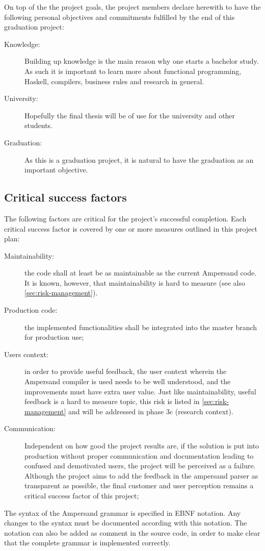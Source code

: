 On top of the the project goals, the project members declare herewith to have the following personal objectives and commitments fulfilled by the end of this graduation project:
\begin{description}
	\item[Knowledge:] Building up knowledge is the main reason why one starts a bachelor study.
		As such it is important to learn more about functional programming, Haskell, compilers, business rules and research in general.
	\item[University:] Hopefully the final thesis will be of use for the university and other students.
	\item[Graduation:] As this is a graduation project, it is natural to have the graduation as an important objective.
\end{description}

\subsection{Critical success factors}
\label{subsec:success-factors}
The following factors are critical for the project's successful completion.
Each critical success factor is covered by one or more measures outlined in this project plan:
\begin{description}
	\item[Maintainability:] the code shall at least be as maintainable as the current Ampersand code.
		It is known, however, that maintainability is hard to measure (see also \autoref{sec:risk-management}).
	\item[Production code:] the implemented functionalities shall be integrated into the master branch for production use;
	\item[Users context:] in order to provide useful feedback, the user context wherein the Ampersand compiler is used needs to be well understood, and the improvements must have extra user value. 
		Just like maintainability, useful feedback is a hard to measure topic, this risk is listed in \autoref{sec:risk-management} and will be addressed in phase 3c (research context).
	\item[Communication:] Independent on how good the project results are, if the solution is put into production without proper communication and documentation leading to confused and demotivated users, the project will be perceived as a failure. 
	Although the project aims to add the feedback in the ampersand parser as transparent as possible, the final customer and user perception remains a critical success factor of this project;
\end{description}
%
The syntax of the Ampersand grammar is specified in EBNF notation.
Any changes to the syntax must be documented according with this notation.
The notation can also be added as comment in the source code, in order to make clear that the complete grammar is implemented correctly.


